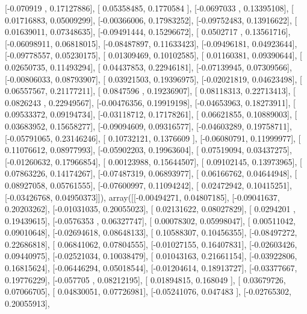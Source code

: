 \documentclass{article}
\begin{document}
       [-0.070919  ,  0.17127886],
       [ 0.05358485,  0.1770584 ],
       [-0.0697033 ,  0.13395108],
       [ 0.01716883,  0.05009299],
       [-0.00366006,  0.17983252],
       [-0.09752483,  0.13916622],
       [ 0.01639011,  0.07348635],
       [-0.09491444,  0.15296672],
       [ 0.0502717 ,  0.13561716],
       [-0.06098911,  0.06818015],
       [-0.08487897,  0.11633423],
       [-0.09496181,  0.04923644],
       [-0.09778557,  0.05230175],
       [ 0.01309469,  0.10102585],
       [ 0.01160381,  0.09390644],
       [ 0.02650735,  0.11493294],
       [ 0.04437853,  0.22946181],
       [-0.07139945,  0.07309566],
       [-0.00806033,  0.08793907],
       [ 0.03921503,  0.19396975],
       [-0.02021819,  0.04623498],
       [ 0.06557567,  0.21177211],
       [ 0.0847596 ,  0.19236907],
       [ 0.08118313,  0.22713413],
       [ 0.0826243 ,  0.22949567],
       [-0.00476356,  0.19919198],
       [-0.04653963,  0.18273911],
       [ 0.09533372,  0.09194734],
       [-0.03118712,  0.17178261],
       [ 0.06621855,  0.10889003],
       [ 0.03683952,  0.15658277],
       [-0.09094609,  0.09316577],
       [-0.04603289,  0.19758711],
       [-0.05791065,  0.23146246],
       [ 0.10732121,  0.1376609 ],
       [-0.06080791,  0.11999977],
       [ 0.11076612,  0.08977993],
       [-0.05902203,  0.19963604],
       [ 0.07519094,  0.03437275],
       [-0.01260632,  0.17966854],
       [ 0.00123988,  0.15644507],
       [ 0.09102145,  0.13973965],
       [ 0.07863226,  0.14174267],
       [-0.07487319,  0.06893977],
       [ 0.06166762,  0.04644948],
       [ 0.08927058,  0.05761555],
       [-0.07600997,  0.11094242],
       [ 0.02472942,  0.10415251],
       [-0.03426768,  0.04950373]]), array([[-0.00494271,  0.04807185],
       [-0.09041637,  0.20203262],
       [-0.01031035,  0.20055023],
       [ 0.02131622,  0.08027829],
       [ 0.0294201 ,  0.19439615],
       [-0.0576353 ,  0.06327747],
       [ 0.00078302,  0.05998047],
       [ 0.00511042,  0.09010648],
       [-0.02694618,  0.08648133],
       [ 0.10588307,  0.10456355],
       [-0.08497272,  0.22686818],
       [ 0.06841062,  0.07804555],
       [-0.01027155,  0.16407831],
       [-0.02603426,  0.09440975],
       [-0.02521034,  0.10038479],
       [ 0.01043163,  0.21661154],
       [-0.03922806,  0.16815624],
       [-0.06446294,  0.05018544],
       [-0.01204614,  0.18913727],
       [-0.03377667,  0.19776229],
       [-0.057705  ,  0.08212195],
       [ 0.01894815,  0.168049  ],
       [ 0.03679726,  0.07066705],
       [ 0.04830051,  0.07726981],
       [-0.05241076,  0.047483  ],
       [-0.02765302,  0.20055913],
\end{document}
